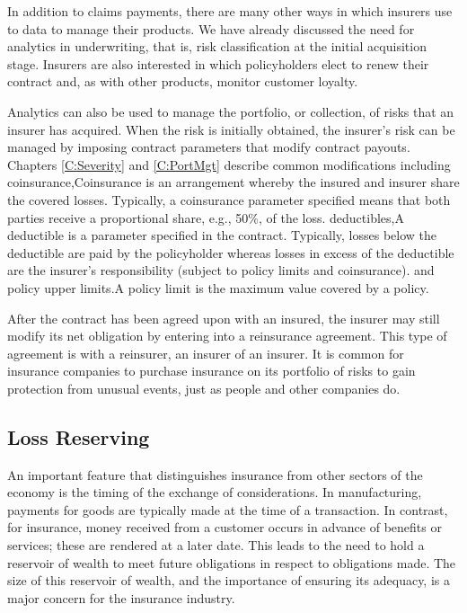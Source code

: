 \documentclass[]{book}
\theoremstyle{definition}
\theoremstyle{definition}
\theoremstyle{definition}
\theoremstyle{remark}
\begin{document}
In addition to claims payments, there are many other ways in which
insurers use to data to manage their products. We have already discussed
the need for analytics in underwriting, that is, risk classification at
the initial acquisition stage. Insurers are also interested in which
policyholders elect to renew their contract and, as with other products,
monitor customer loyalty.

Analytics can also be used to manage the portfolio, or collection, of
risks that an insurer has acquired. When the risk is initially obtained,
the insurer's risk can be managed by imposing contract parameters that
modify contract payouts. Chapters \ref{C:Severity} and \ref{C:PortMgt}
describe common modifications including coinsurance,{Coinsurance is an
arrangement whereby the insured and insurer share the covered losses.
Typically, a coinsurance parameter specified means that both parties
receive a proportional share, e.g., 50\%, of the loss.} deductibles,{A
deductible is a parameter specified in the contract. Typically, losses
below the deductible are paid by the policyholder whereas losses in
excess of the deductible are the insurer's responsibility (subject to
policy limits and coinsurance).} and policy upper limits.{A policy limit
is the maximum value covered by a policy.}

After the contract has been agreed upon with an insured, the insurer may
still modify its net obligation by entering into a reinsurance
agreement. This type of agreement is with a reinsurer, an insurer of an
insurer. It is common for insurance companies to purchase insurance on
its portfolio of risks to gain protection from unusual events, just as
people and other companies do.

\subsection{Loss Reserving}\label{S:Reserving}

An important feature that distinguishes insurance from other sectors of
the economy is the timing of the exchange of considerations. In
manufacturing, payments for goods are typically made at the time of a
transaction. In contrast, for insurance, money received from a customer
occurs in advance of benefits or services; these are rendered at a later
date. This leads to the need to hold a reservoir of wealth to meet
future obligations in respect to obligations made. The size of this
reservoir of wealth, and the importance of ensuring its adequacy, is a
major concern for the insurance industry.
\end{document}
